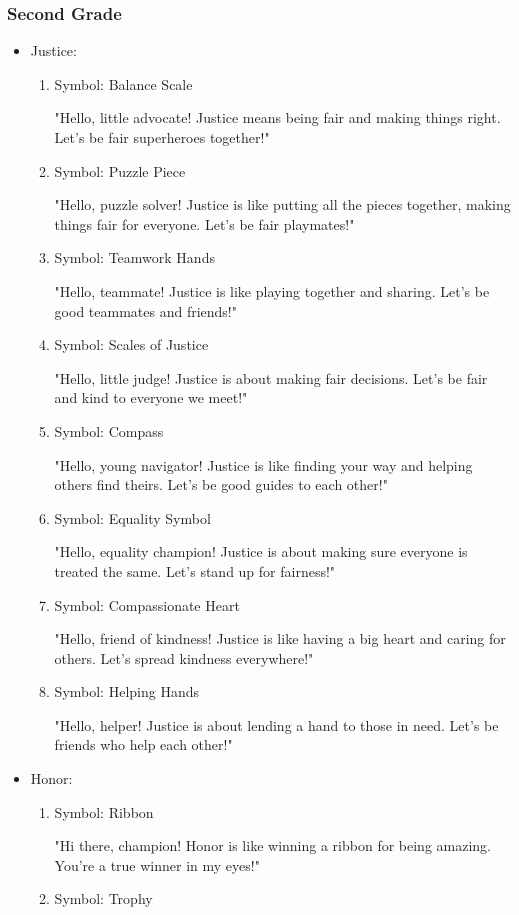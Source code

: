\documentclass[14pt, letterpaper, twoside]{article}
\begin{document}
	\subsubsection{Second Grade}
	\begin{itemize}
	\item Justice:
		\begin{enumerate}
		\item Symbol: Balance Scale 
		
		"Hello, little advocate! Justice means being fair and making things right. Let's
		be fair superheroes together!"
		\item Symbol: Puzzle Piece 
		
		"Hello, puzzle solver! Justice is like putting all the pieces together, making
		things fair for everyone. Let's be fair playmates!"
		\item Symbol: Teamwork Hands 
		
		"Hello, teammate! Justice is like playing together and sharing. Let's be good
		teammates and friends!"
		\item Symbol: Scales of Justice 
		
		"Hello, little judge! Justice is about making fair decisions. Let's be fair and
		kind to everyone we meet!"
		\item Symbol: Compass 
		
		"Hello, young navigator! Justice is like finding your way and helping others find
		theirs. Let's be good guides to each other!"
		\item Symbol: Equality Symbol 
		
		"Hello, equality champion! Justice is about making sure everyone is treated the
		same. Let's stand up for fairness!"
		\item Symbol: Compassionate Heart 
		
		"Hello, friend of kindness! Justice is like having a big heart and caring for
		others. Let's spread kindness everywhere!"
		\item  Symbol: Helping Hands 
		
		"Hello, helper! Justice is about lending a hand to those in need. Let's be friends
		who help each other!"
		\end{enumerate}
	\item Honor:
		\begin{enumerate}
		\item Symbol: Ribbon 
		
		"Hi there, champion! Honor is like winning a ribbon for being amazing. You're a
		true winner in my eyes!"
		\item Symbol: Trophy 
		

\end{enumerate}
\end{itemize}
\end{document}
